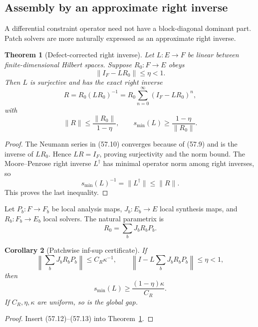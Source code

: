 \documentclass[11pt]{article}
\newtheorem{theorem}{Theorem}[section]
\newtheorem{corollary}[theorem]{Corollary}
\begin{document}
\subsection{Assembly by an approximate right inverse}

A differential constraint operator need not have a block-diagonal
dominant part.  Patch solvers are more naturally expressed as an
approximate right inverse.

\begin{theorem}[Defect-corrected right inverse]
\label{thm:v11v57-right-inverse}
Let \(L:E\to F\) be linear between finite-dimensional Hilbert spaces.
Suppose \(R_0:F\to E\) obeys
\[
                       \lVert I_F-LR_0\rVert\le\eta<1.         \tag{57.9}
\]
Then \(L\) is surjective and has the exact right inverse
\[
                R=R_0(LR_0)^{-1}
                 =R_0\sum_{n=0}^{\infty}(I_F-LR_0)^n,         \tag{57.10}
\]
with
\[
                    \lVert R\rVert
                    \le\frac{\lVert R_0\rVert}{1-\eta},
 \qquad
                    s_{\min}(L)
                    \ge\frac{1-\eta}{\lVert R_0\rVert}.       \tag{57.11}
\]
\end{theorem}

\begin{proof}
The Neumann series in (57.10) converges because of (57.9) and is the
inverse of \(LR_0\).  Hence \(LR=I_F\), proving surjectivity and the
norm bound.  The Moore--Penrose right inverse \(L^\dagger\) has minimal
operator norm among right inverses, so
\[
 s_{\min}(L)^{-1}=\lVert L^\dagger\rVert\le\lVert R\rVert.
\]
This proves the last inequality.
\end{proof}

Let \(P_b:F\to F_b\) be local analysis maps, \(J_b:E_b\to E\) local
synthesis maps, and \(R_b:F_b\to E_b\) local solvers.  The natural
parametrix is
\[
                              R_0=\sum_bJ_bR_bP_b.             \tag{57.12}
\]

\begin{corollary}[Patchwise inf-sup certificate]
\label{cor:v11v57-patch}
If
\[
               \left\|\sum_bJ_bR_bP_b\right\|\le C_R\kappa^{-1},
 \qquad
               \left\|I-L\sum_bJ_bR_bP_b\right\|\le\eta<1,    \tag{57.13}
\]
then
\[
                              s_{\min}(L)
                       \ge\frac{(1-\eta)\kappa}{C_R}.          \tag{57.14}
\]
If \(C_R,\eta,\kappa\) are uniform, so is the global gap.
\end{corollary}

\begin{proof}
Insert (57.12)--(57.13) into
Theorem~\ref{thm:v11v57-right-inverse}.
\end{proof}
\end{document}
